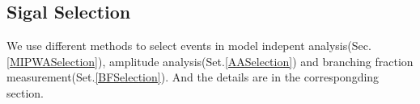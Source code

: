 \subsection{Sigal Selection}
\par{


    We use different methods to select events in model indepent analysis(Sec.\ref{MIPWASelection}), amplitude analysis(Set.\ref{AASelection}) and branching fraction measurement(Set.\ref{BFSelection}).
And the details are in the correspongding section.
}




